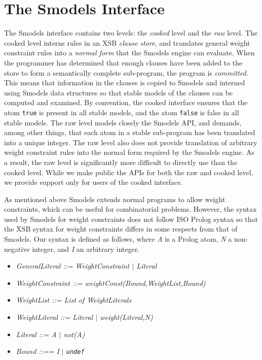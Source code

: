 \section{The Smodels Interface}
%
The Smodels interface contains two levels: the \emph{cooked} level and
the \emph{raw} level.  The cooked level interns rules in an XSB
\emph{clause store}, and translates general weight constraint rules
\cite{SiNS02} into a \emph{normal form} that the Smodels engine can
evaluate.  When the programmer has determined that enough clauses have
been added to the store to form a semantically complete sub-program,
the program is \emph{committed}.  This means that information in the
clauses is copied to Smodels and interned using Smodels data
structures so that stable models of the clauses can be computed and
examined.  By convention, the cooked interface ensures that the atom
{\tt true} is present in all stable models, and the atom {\tt false}
is false in all stable models.  The raw level models closely the
Smodels API, and demands, among other things, that each atom in a
stable sub-program has been translated into a unique integer.  The raw
level also does not provide translation of arbitrary weight constraint
rules into the normal form required by the Smodels engine.  As a
result, the raw level is significantly more difficult to directly use
than the cooked level.  While we make public the APIs for both the raw
and cooked level, we provide support only for users of the cooked
interface.

As mentioned above Smodels extends normal programs to allow weight
constraints, which can be useful for combinatorial problems.  However,
the syntax used by Smodels for weight constraints does not follow ISO
Prolog syntax so that the XSB syntax for weight constraints differs in
some respects from that of Smodels.  Our syntax is defined as follows,
where \emph{A} is a Prolog atom, \emph{N} a non-negative integer, and
\emph{I} an arbitrary integer.

\begin{itemize}

\item {\em GeneralLiteral ::= WeightConstraint $|$ Literal }

\item {\em WeightConstraint ::= weightConst(Bound,WeightList,Bound) }

\item {\em WeightList ::= List of WeightLiterals }

\item {\em WeightLiteral ::= Literal $|$ weight(Literal,N) }

\item {\em Literal ::= A $|$ not(A) }

\item {\em Bound ::== I $|$ {\tt undef} }

\end{itemize}

